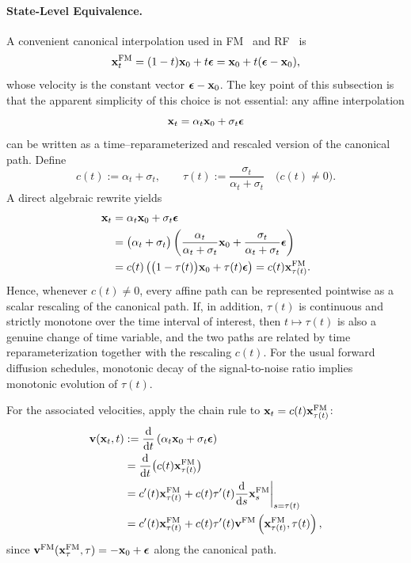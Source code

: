 \paragraph{State-Level Equivalence.}
A convenient canonical interpolation used in FM~\citep{lipman2022flow} and RF~\citep{liu2022rectified} is
\[
{\mathbf{x}}_t^{\mathrm{FM}}=(1-t) {\mathbf{x}}_0+t {\bm{\epsilon}} = {\mathbf{x}}_{0}+t({\bm{\epsilon}}-{\mathbf{x}}_0),
\]
whose velocity is the constant vector ${\bm{\epsilon}}-{\mathbf{x}}_0$. The key point of this subsection is that the apparent simplicity of this choice is not essential: any affine interpolation
\[
{\mathbf{x}}_t=\alpha_t {\mathbf{x}}_0+\sigma_t {\bm{\epsilon}}
\]
can be written as a time–reparameterized and rescaled version of the canonical path. Define
\[
c(t):=\alpha_t+\sigma_t,
\qquad
\tau(t):=\frac{\sigma_t}{\alpha_t+\sigma_t}
\quad\big(c(t)\neq 0\big).
\]
A direct algebraic rewrite yields
\begin{align*}
{\mathbf{x}}_t
&=\alpha_t {\mathbf{x}}_0+\sigma_t {\bm{\epsilon}}
\\
&=\big(\alpha_t+\sigma_t\big) \left(\frac{\alpha_t}{\alpha_t+\sigma_t}{\mathbf{x}}_0+\frac{\sigma_t}{\alpha_t+\sigma_t}{\bm{\epsilon}}\right) \\
&=c(t) \left(\big(1-\tau(t)\big){\mathbf{x}}_0+\tau(t){\bm{\epsilon}}\right)
=c(t) {\mathbf{x}}_{\tau(t)}^{\mathrm{FM}}.
\end{align*}
Hence, whenever $c(t)\neq0$, every affine path can be represented pointwise
as a scalar rescaling of the canonical path. If, in addition, $\tau(t)$ is
continuous and strictly monotone over the time interval of interest, then
$t\mapsto\tau(t)$ is also a genuine change of time variable, and the two paths
are related by time reparameterization together with the rescaling $c(t)$.
For the usual forward diffusion schedules, monotonic decay of the
signal-to-noise ratio implies monotonic evolution of $\tau(t)$.

For the associated velocities, apply the chain rule to ${\mathbf{x}}_t=c(t){\mathbf{x}}_{\tau(t)}^{\mathrm{FM}}$:
\begin{align*}
{\mathbf{v}}({\mathbf{x}}_t,t)
&:= \frac{\mathop{}\!\mathrm{d}}{\mathop{}\!\mathrm{d} t}\left(\alpha_t{\mathbf{x}}_0 +\sigma_t {\bm{\epsilon}}\right)
\\&=\frac{\mathop{}\!\mathrm{d}}{\mathop{}\!\mathrm{d} t}\big(c(t){\mathbf{x}}_{\tau(t)}^{\mathrm{FM}}\big)
\\
&=c'(t) {\mathbf{x}}_{\tau(t)}^{\mathrm{FM}}+c(t) \tau'(t) \frac{\mathop{}\!\mathrm{d}}{\mathop{}\!\mathrm{d} s}{\mathbf{x}}^{\mathrm{FM}}_{s}\bigg|_{s=\tau(t)} \\
&=c'(t) {\mathbf{x}}_{\tau(t)}^{\mathrm{FM}}+c(t) \tau'(t) {\mathbf{v}}^{\mathrm{FM}} \left({\mathbf{x}}_{\tau(t)}^{\mathrm{FM}},\tau(t)\right),
\end{align*}
since ${\mathbf{v}}^{\mathrm{FM}}({\mathbf{x}}^{\mathrm{FM}}_{\tau},\tau)=-{\mathbf{x}}_0+{\bm{\epsilon}}$ along the canonical path.


